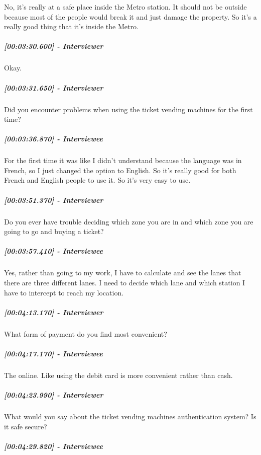 \documentclass[a4paper,12pt]{article}
\begin{document}
No, it's really at a safe place inside the Metro station. It should not
be outside because most of the people would break it and just damage the
property. So it's a really good thing that it's inside the Metro.

\hypertarget{interviewer-21}{%
\subparagraph{{[}00:03:30.600{]} - Interviewer}\label{interviewer-21}}

Okay.

\hypertarget{interviewer-22}{%
\subparagraph{{[}00:03:31.650{]} - Interviewer}\label{interviewer-22}}

Did you encounter problems when using the ticket vending machines for
the first time?

\hypertarget{interviewee-15}{%
\subparagraph{{[}00:03:36.870{]} - Interviewee}\label{interviewee-15}}

For the first time it was like I didn't understand because the language
was in French, so I just changed the option to English. So it's really
good for both French and English people to use it. So it's very easy to
use.

\hypertarget{interviewer-23}{%
\subparagraph{{[}00:03:51.370{]} - Interviewer}\label{interviewer-23}}

Do you ever have trouble deciding which zone you are in and which zone
you are going to go and buying a ticket?

\hypertarget{interviewee-16}{%
\subparagraph{{[}00:03:57.410{]} - Interviewee}\label{interviewee-16}}

Yes, rather than going to my work, I have to calculate and see the lanes
that there are three different lanes. I need to decide which lane and
which station I have to intercept to reach my location.

\hypertarget{interviewer-24}{%
\subparagraph{{[}00:04:13.170{]} - Interviewer}\label{interviewer-24}}

What form of payment do you find most convenient?

\hypertarget{interviewee-17}{%
\subparagraph{{[}00:04:17.170{]} - Interviewee}\label{interviewee-17}}

The online. Like using the debit card is more convenient rather than
cash.

\hypertarget{interviewer-25}{%
\subparagraph{{[}00:04:23.990{]} - Interviewer}\label{interviewer-25}}

What would you say about the ticket vending machines authentication
system? Is it safe secure?

\hypertarget{interviewee-18}{%
\subparagraph{{[}00:04:29.820{]} - Interviewee}\label{interviewee-18}}
\end{document}
